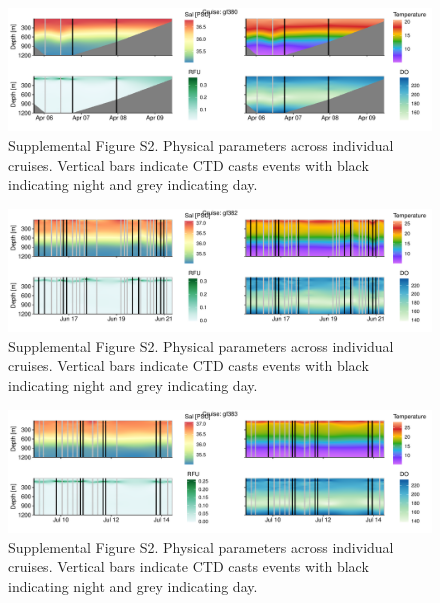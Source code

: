 \documentclass[
]{article}
\begin{document}
\begin{figure}

{\centering \includegraphics[width=1\textwidth,height=\textheight]{index_files/figure-pdf/unnamed-chunk-19-11.pdf}

}

\caption{Supplemental Figure S2. Physical parameters across individual
cruises. Vertical bars indicate CTD casts events with black indicating
night and grey indicating day.}

\end{figure}

\begin{figure}

{\centering \includegraphics[width=1\textwidth,height=\textheight]{index_files/figure-pdf/unnamed-chunk-19-12.pdf}

}

\caption{Supplemental Figure S2. Physical parameters across individual
cruises. Vertical bars indicate CTD casts events with black indicating
night and grey indicating day.}

\end{figure}

\begin{figure}

{\centering \includegraphics[width=1\textwidth,height=\textheight]{index_files/figure-pdf/unnamed-chunk-19-13.pdf}

}

\caption{Supplemental Figure S2. Physical parameters across individual
cruises. Vertical bars indicate CTD casts events with black indicating
night and grey indicating day.}

\end{figure}
\end{document}
